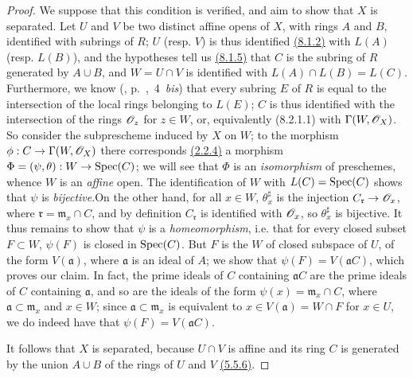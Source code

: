 \begin{proof}
\label{proof-prop-1.8.2.2}
We suppose that this condition is verified, and aim to show that $X$ is separated.
Let $U$ and $V$ be two distinct affine opens of $X$, with rings $A$ and $B$,
identified with subrings of $R$; $U$ (resp. $V$) is thus identified \hyperref[env-1.8.1.2]{(8.1.2)}
with $L(A)$ (resp. $L(B)$), and the hypotheses tell us \hyperref[env-1.8.1.5]{(8.1.5)} that $C$ is
the subring of $R$ generated by $A\cup B$, and $W=U\cap V$ is identified with
$L(A)\cap L(B)=L(C)$. Furthermore, we know
(\cite{I-1}, p.~,~4~{\it bis}) that every subring $E$ of $R$ is
equal to the intersection of the local rings belonging to $L(E)$; $C$ is thus
identified with the intersection of the rings $\mathscr{O}_z$ for $z\in W$, or,
equivalently (8.2.1.1) with $\Gamma(W,\mathscr{O}_X)$. So consider the subprescheme
induced by $X$ on $W$; to the  morphism $\phi:
C\to\Gamma(W,\mathscr{O}_X)$ there corresponds \hyperref[prop-1.2.2.4]{(2.2.4)} a morphism
$\Phi=(\psi,\theta):W\to{\mathop{\mathrm{Spec}}\nolimits}(C)$; we will see that $\Phi$ is an
{\it isomorphism} of preschemes, whence $W$ is an {\it affine} open. The
identification of $W$ with $L(C)={\mathop{\mathrm{Spec}}\nolimits}(C)$ shows that $\psi$ is
{\it bijective}.On the other hand, for all $x\in W$, $\theta_x^\sharp$ is the
injection $C_\mathfrak{r}\to\mathscr{O}_x$, where $\mathfrak{r}=\mathfrak{m}_x\cap C$,
and by definition $C_\mathfrak{r}$ is identified with $\mathscr{O}_x$, so $\theta_x^\sharp$
is bijective. It thus remains to show that $\psi$ is a {\it homeomorphism},
i.e. that for every closed subset $F\subset W$, $\psi(F)$ is closed in
${\mathop{\mathrm{Spec}}\nolimits}(C)$. But $F$ is the  $W$ of closed subspace of $U$,
of the form $V(\mathfrak{a})$, where $\mathfrak{a}$ is an ideal of $A$; we show
that $\psi(F)=V(\mathfrak{a}C)$, which proves our claim. In fact, the prime
ideals of $C$ containing $\mathfrak{a}C$ are the prime ideals of $C$ containing
$\mathfrak{a}$, and so are the ideals of the form $\psi(x)=\mathfrak{m}_x\cap
C$, where $\mathfrak{a}\subset\mathfrak{m}_x$ and $x\in W$; since
$\mathfrak{a}\subset\mathfrak{m}_x$ is equivalent to $x\in V(\mathfrak{a})=W\cap
F$ for $x\in U$, we do indeed have that $\psi(F)=V(\mathfrak{a}C)$.

It follows that $X$ is separated, because $U\cap V$ is affine and its ring $C$
is generated by the union $A\cup B$ of the rings of $U$ and $V$ \hyperref[env-1.5.5.6]{(5.5.6)}.


\end{proof}
